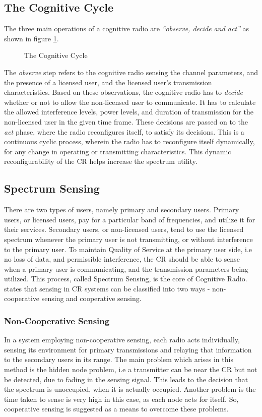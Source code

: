 \subsection{The Cognitive Cycle}
The three main operations of a cognitive radio are \textit{``observe, decide
and act''}\cite{mitola} as shown in figure \ref{fig:cogcycle}.

\begin{figure}[h]
	\centering
	
	\caption{The Cognitive Cycle}
	\label{fig:cogcycle}
\end{figure}

The \textit{observe} step refers to the cognitive radio sensing the channel
parameters, and the presence of a licensed user, and the licensed user's
transmission characteristics. Based on these observations, the cognitive radio
has to \textit{decide} whether or not to allow the non-licensed user to
communicate. It has to calculate the allowed interference levels, power levels,
and duration of transmission for the non-licensed user in the given time frame.
These decisions are passed on to the \textit{act} phase, where the radio
reconfigures itself, to satisfy its decisions. This is a continuous cyclic
process, wherein the radio has to reconfigure itself dynamically, for any change
in operating or transmitting characteristics. This dynamic reconfigurability of
the CR helps increase the spectrum utility.

\subsection{Spectrum Sensing}
There are two types of users, namely primary and secondary users. Primary users,
or licensed users, pay for a particular band of frequencies, and utilize it for
their services. Secondary users, or non-licensed users, tend to use the licensed
spectrum whenever the primary user is not transmitting, or without interference
to the primary user. To maintain Quality of Service at the primary user side,
i.e no loss of data, and permissible interference, the CR should be able to
sense when a primary user is communicating, and the transmission parameters
being utilized. This process, called Spectrum Sensing, is the core of Cognitive
Radio. \cite{doyle} states that sensing in CR systems can be classified into two
ways - non-cooperative sensing and cooperative sensing.

\subsubsection{Non-Cooperative Sensing}
In a system employing non-cooperative sensing, each radio acts individually,
sensing its environment for primary transmissions and relaying that information
to the secondary users in its range. The main problem which arises in this
method is the hidden node problem, i.e a transmitter can be near the CR but not
be detected, due to fading in the sensing signal. This leads to the decision
that the spectrum is unoccupied, when it is actually occupied. Another problem
is the time taken to sense is very high in this case, as each node acts for
itself. So, cooperative sensing is suggested as a means to overcome these
problems.

